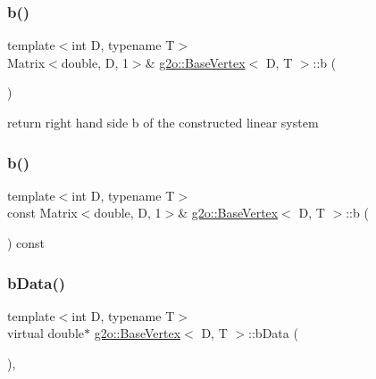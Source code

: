 \subsubsection{\texorpdfstring{b()}{b()}\hspace{0.1cm}{\footnotesize\ttfamily [3/4]}}
{\footnotesize\ttfamily template$<$int D, typename T$>$ \\
Matrix$<$double, D, 1$>$\& \mbox{\hyperlink{classg2o_1_1_base_vertex}{g2o\+::\+Base\+Vertex}}$<$ D, T $>$\+::b (\begin{DoxyParamCaption}{ }\end{DoxyParamCaption})\hspace{0.3cm}{\ttfamily [inline]}}



return right hand side b of the constructed linear system 

\mbox{\label{classg2o_1_1_base_vertex_a6b0bf63c79b2b36186680b2a73ec70bf}} 
\subsubsection{\texorpdfstring{b()}{b()}\hspace{0.1cm}{\footnotesize\ttfamily [4/4]}}
{\footnotesize\ttfamily template$<$int D, typename T$>$ \\
const Matrix$<$double, D, 1$>$\& \mbox{\hyperlink{classg2o_1_1_base_vertex}{g2o\+::\+Base\+Vertex}}$<$ D, T $>$\+::b (\begin{DoxyParamCaption}{ }\end{DoxyParamCaption}) const\hspace{0.3cm}{\ttfamily [inline]}}

\mbox{\label{classg2o_1_1_base_vertex_ac8edea7073e5850c90b0ba37092b8f84}} 
\subsubsection{\texorpdfstring{b\+Data()}{bData()}}
{\footnotesize\ttfamily template$<$int D, typename T$>$ \\
virtual double$\ast$ \mbox{\hyperlink{classg2o_1_1_base_vertex}{g2o\+::\+Base\+Vertex}}$<$ D, T $>$\+::b\+Data (\begin{DoxyParamCaption}{ }\end{DoxyParamCaption})\hspace{0.3cm}{\ttfamily [inline]}, {\ttfamily [virtual]}}



